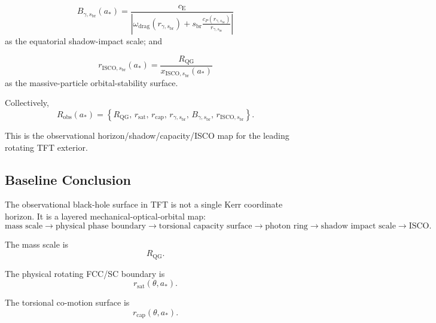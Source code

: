 \begin{equation}
    \boxed{ B_{\gamma,s_{\mathrm{br}}}(a_\ast) = \frac{ c_{\mathrm{E}} }{ \left| \omega_{\mathrm{drag}}(r_{\gamma,s_{\mathrm{br}}}) + s_{\mathrm{br}} \frac{c_P(r_{\gamma,s_{\mathrm{br}}})}{r_{\gamma,s_{\mathrm{br}}}} \right| } }
\end{equation}
as the equatorial shadow-impact scale; and

\begin{equation}
    \boxed{ r_{\mathrm{ISCO},s_{\mathrm{br}}}(a_\ast) = \frac{R_{\mathrm{QG}}}{x_{\mathrm{ISCO},s_{\mathrm{br}}}(a_\ast)} }
\end{equation}
as the massive-particle orbital-stability surface.

Collectively,
\begin{equation}
    \boxed{ R_{\mathrm{obs}}(a_\ast) = \left\{ R_{\mathrm{QG}}, \, r_{\mathrm{sat}}, \, r_{\mathrm{cap}}, \, r_{\gamma,s_{\mathrm{br}}}, \, B_{\gamma,s_{\mathrm{br}}}, \, r_{\mathrm{ISCO},s_{\mathrm{br}}} \right\}. }
\end{equation}

This is the observational horizon/shadow/capacity/ISCO map for the leading rotating TFT exterior.

\subsection{Baseline Conclusion}

The observational black-hole surface in TFT is not a single Kerr coordinate horizon. It is a layered mechanical-optical-orbital map:
\begin{equation}
    \boxed{ \text{mass scale} \rightarrow \text{physical phase boundary} \rightarrow \text{torsional capacity surface} \rightarrow \text{photon ring} \rightarrow \text{shadow impact scale} \rightarrow \text{ISCO}. }
\end{equation}

The mass scale is
\begin{equation}
    R_{\mathrm{QG}}.
\end{equation}

The physical rotating FCC/SC boundary is
\begin{equation}
    r_{\mathrm{sat}}(\theta,a_\ast).
\end{equation}

The torsional co-motion surface is
\begin{equation}
    r_{\mathrm{cap}}(\theta,a_\ast).
\end{equation}

